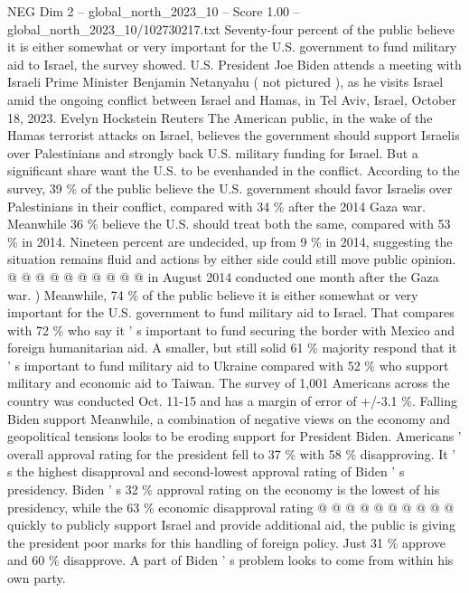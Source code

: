 \begin{textsample}{NEG Dim 2 – global\_north\_2023\_10 – Score 1.00 – global\_north\_2023\_10/102730217.txt}  \label{ex:f2_neg_167}
Seventy-four percent of the public believe it is either somewhat or very important for the U.S. government to fund military aid to Israel, the survey showed.
U.S.
President Joe Biden attends a meeting with Israeli Prime Minister Benjamin Netanyahu ( not pictured ), as he visits Israel amid the ongoing conflict between Israel and Hamas, in Tel Aviv, Israel, October 18, 2023.
Evelyn Hockstein Reuters The American public, in the wake of the Hamas terrorist attacks on Israel, believes the government should support Israelis over Palestinians and strongly back U.S. military funding for Israel.
But a significant share want the U.S. to be evenhanded in the conflict.
According to the survey, 39 \% of the public believe the U.S. government should favor Israelis over Palestinians in their conflict, compared with 34 \% after the 2014 Gaza war.
Meanwhile 36 \% believe the U.S. should treat both the same, compared with 53 \% in 2014.
Nineteen percent are undecided, up from 9 \% in 2014, suggesting the situation remains fluid and actions by either side could still move public opinion. @ @ @ @ @ @ @ @ @ @ in August 2014 conducted one month after the Gaza war. ) Meanwhile, 74 \% of the public believe it is either somewhat or very important for the U.S. government to fund military aid to Israel.
That compares with 72 \% who say it ' s important to fund securing the border with Mexico and foreign humanitarian aid.
A smaller, but still solid 61 \% majority respond that it ' s important to fund military aid to Ukraine compared with 52 \% who support military and economic aid to Taiwan.
The survey of 1,001 Americans across the country was conducted Oct. 11-15 and has a margin of error of +/-3.1 \%.
Falling Biden support Meanwhile, a combination of negative views on the economy and geopolitical tensions looks to be eroding support for President Biden.
Americans ' overall approval rating for the president fell to 37 \% with 58 \% disapproving.
It ' s the highest disapproval and second-lowest approval rating of Biden ' s presidency.
Biden ' s 32 \% approval rating on the economy is the lowest of his presidency, while the 63 \% economic disapproval rating @ @ @ @ @ @ @ @ @ @ quickly to publicly support Israel and provide additional aid, the public is giving the president poor marks for this handling of foreign policy.
Just 31 \% approve and 60 \% disapprove.
A part of Biden ' s problem looks to come from within his own party.

\end{textsample}
